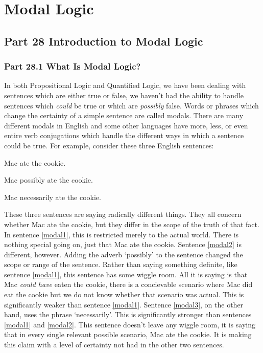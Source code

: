 \part{Modal Logic}
\label{ch.ml1}
\chapter{Part 28 Introduction to Modal Logic}
\section{Part 28.1 What Is Modal Logic?}
In both Propositional Logic and Quantified Logic, we have been dealing with sentences which are either true or false, we haven't had the ability to handle sentences which \emph{could} be true or which are \emph{possibly} false. Words or phrases which change the certainty of a simple sentence are called \glspl{modal}. There are many different modals in English and some other languages have more, less, or even entire verb conjugations which handle the different ways in which a sentence could be true. For example, consider these three English sentences:

\setcounter{Example}{0}
\begin{earg}
	\item[\ex{modal1}] Mac ate the cookie.
	\item[\ex{modal2}] Mac possibly ate the cookie.
	\item[\ex{modal3}] Mac necessarily ate the cookie. 
\end{earg}

These three sentences are saying radically different things. They all concern whether Mac ate the cookie, but they differ in the scope of the truth of that fact.  In sentence \ref{modal1}, this is restricted merely to the actual world. There is nothing special going on, just that Mac ate the cookie. Sentence \ref{modal2} is different, however. Adding the adverb `possibly' to the sentence changed the scope or range of the sentence. Rather than saying something definite, like sentence \ref{modal1}, this sentence has some wiggle room. All it is saying is that Mac \emph{could have} eaten the cookie, there is a concievable scenario where Mac did eat the cookie but we do not know whether that scenario was actual. This is significantly weaker than sentence \ref{modal1}. Sentence \ref{modal3}, on the other hand, uses the phrase `necessarily'. This is significantly stronger than sentences \ref{modal1} and \ref{modal2}. This sentence doesn't leave any wiggle room, it is saying that in every single relevant possible scenario, Mac ate the cookie. It is making this claim with a level of certainty not had in the other two sentences. 

